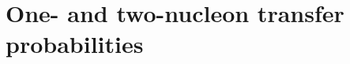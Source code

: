 \section[Transfer probabilities, enhancement factor]{One- and two-nucleon transfer probabilities}\label{C3S2}

